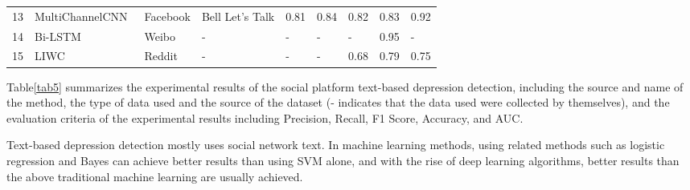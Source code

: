 \begin{table*}
\begin{tabular}{l|l|ll|lllll}
13                                      & MultiChannelCNN~\cite{orabi2018deep}                           & Facebook                       & Bell Let’s Talk             & 0.81                          & 0.84                       & 0.82                         & 0.83                         & 0.92                    \\
14                                      & Bi-LSTM~\cite{hu2021depression}                                & Weibo                          & -                           & -                             & -                          & -                            & 0.95                         & -                       \\
15                                      & LIWC~\cite{wolohan2018detecting}                               & Reddit                         & -                           & -                             & -                          & 0.68                         & 0.79                         & 0.75                   \\
\hline
\end{tabular}
\end{table*}


Table\ref{tab5} summarizes the experimental results of the social platform text-based depression detection, including the source and name of the method, the type of data used and the source of the dataset (- indicates that the data used were collected by themselves), and the evaluation criteria of the experimental results including Precision, Recall, F1 Score, Accuracy, and AUC.

Text-based depression detection mostly uses social network text. In machine learning methods, using related methods such as logistic regression and Bayes can achieve better results than using SVM alone, and with the rise of deep learning algorithms, better results than the above traditional machine learning are usually achieved.


\ifx\allfiles\undefined

\fi
